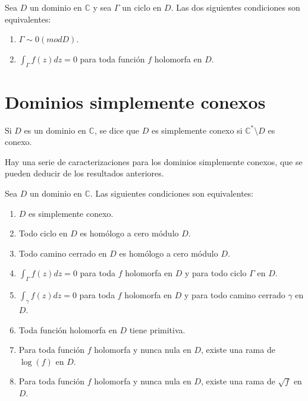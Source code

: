 \begin{theorem}
    Sea $D$ un dominio en $\mathbb{C}$ y sea $\Gamma$ un ciclo en $D$.
    Las dos siguientes condiciones son equivalentes:
    \begin{enumerate}
        \item $\Gamma \sim 0 (mod D)$.
        \item $\int_\Gamma f(z)dz = 0$ para toda función $f$ holomorfa en $D$.
    \end{enumerate}
\end{theorem}

\section{Dominios simplemente conexos}
\begin{definition}
    Si $D$ es un dominio en $\mathbb{C}$, se dice que $D$ es simplemente conexo si $\mathbb{C}^\ast \setminus D$ es conexo.
\end{definition}

Hay una serie de caracterizaciones para los dominios simplemente conexos, que se pueden deducir de los resultados anteriores.

\begin{theorem}
    Sea $D$ un dominio en $\mathbb{C}$.
    Las siguientes condiciones son equivalentes:
    \begin{enumerate}
        \item $D$ es simplemente conexo.
        \item Todo ciclo en $D$ es homólogo a cero módulo $D$.
        \item Todo camino cerrado en $D$ es homólogo a cero módulo $D$.
        \item $\int_\Gamma f(z)dz = 0$ para toda $f$ holomorfa en $D$ y para todo ciclo $\Gamma$ en $D$.
        \item $\int_\gamma f(z)dz = 0$ para toda $f$ holomorfa en $D$ y para todo camino cerrado $\gamma$ en $D$.
        \item Toda función holomorfa en $D$ tiene primitiva.
        \item Para toda función $f$ holomorfa y nunca nula en $D$, existe una rama de $\log(f)$ en $D$.
        \item Para toda función $f$ holomorfa y nunca nula en $D$, existe una rama de $\sqrt{f}$ en $D$.
    \end{enumerate}
\end{theorem}

